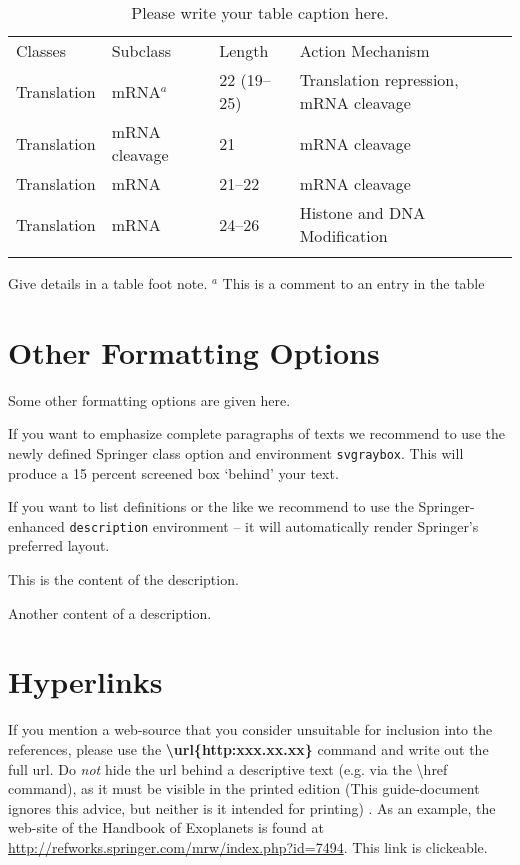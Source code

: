 \documentclass[graybox,natbib,nosecnum]{svmult}
\begin{document}
%
%
\begin{table}
\caption{Please write your table caption here.}
\label{tab:1}       %
%
%
\begin{tabular}{p{2cm}p{2.4cm}p{2cm}p{4.9cm}}
\hline\noalign{\smallskip}
Classes & Subclass & Length & Action Mechanism  \\
\noalign{\smallskip}\svhline\noalign{\smallskip}
Translation & mRNA$^a$  & 22 (19--25) & Translation repression, mRNA cleavage\\
Translation & mRNA cleavage & 21 & mRNA cleavage\\
Translation & mRNA  & 21--22 & mRNA cleavage\\
Translation & mRNA  & 24--26 & Histone and DNA Modification\\
\noalign{\smallskip}\hline\noalign{\smallskip}
\end{tabular}
Give details in a table foot note. $^a$ This is a comment to an entry in the table
\end{table}
%

\section{Other Formatting Options}
Some other formatting options are given here.
\begin{svgraybox}
If you want to emphasize complete paragraphs of texts we recommend to use the newly defined Springer class option and environment \verb|svgraybox|. This will produce a 15 percent screened box `behind' your text.
\end{svgraybox}

If you want to list definitions or the like we recommend to use the Springer-enhanced \verb|description| environment -- it will automatically render Springer's preferred layout.
\begin{description}[Type 1]
\item[Type 1]{This is the content of the description.}
\item[Type 2]{Another content of a description.}
\end{description}

\section{Hyperlinks}
If you mention a web-source that you consider unsuitable for inclusion into the references, please use the {\bf \textbackslash url\{http:\/\/xxx.xx.xx\}} command and write out the full url. Do \emph{not} hide the url behind a descriptive text (e.g. via the \textbackslash href command), as it must be visible in the printed edition (This guide-document ignores this advice, but neither is it intended for printing) . As an example, the web-site of the Handbook of Exoplanets is found at \url{http://refworks.springer.com/mrw/index.php?id=7494}. This link is clickeable.
\end{document}
